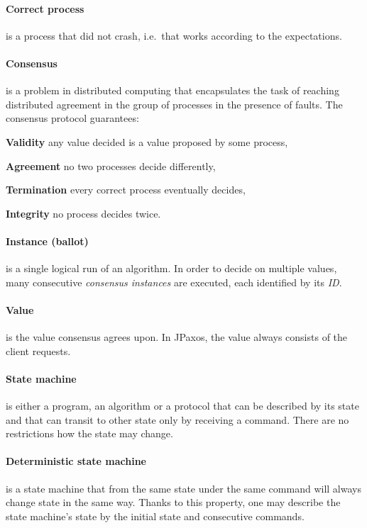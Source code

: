 \paragraph{Correct process} is a process that did not crash, i.e.\ that works according to the expectations.

\paragraph{Consensus}
is a problem in distributed computing that encapsulates the task of reaching distributed agreement in the group of processes in the presence of faults.
The consensus protocol guarantees:

\begin{tightList}[\setlength{\leftmargin}{2\leftmargin}]
    \item[\textbf{Validity}] any value decided is a value proposed by some process,
    \item[\textbf{Agreement}] no two processes decide differently,
    \item[\textbf{Termination}] every correct process eventually decides,
    \item[\textbf{Integrity}] no process decides twice.
\end{tightList}

\paragraph{Instance (ballot)} is a single logical run of an algorithm. In order to decide on multiple values, many consecutive \textit{consensus instances} are executed, each identified by its \textit{ID}.

\paragraph{Value} is the value consensus agrees upon. In JPaxos, the value always consists of the client requests.

\paragraph{State machine}
is either a program, an algorithm or a protocol that can be described by its state and that can transit to other state only by receiving a command.
There are no restrictions how the state may change.

\paragraph{Deterministic state machine}
is a state machine that from the same state under the same command will always change state in the same way.
Thanks to this property, one may describe the state machine's state by the initial state and consecutive commands. 

